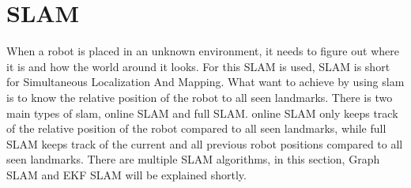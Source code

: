 \section{SLAM}
When a robot is placed in an unknown environment, it needs to figure out where it is and how the world around it looks. For this SLAM is used, SLAM is short for Simultaneous Localization And Mapping. 
What want to achieve by using slam is to know the relative position of the robot to all seen landmarks. There is two main types of slam, online SLAM and full SLAM. online SLAM only keeps track of the relative position of the robot compared to all seen landmarks, while full SLAM keeps track of the current and all previous robot positions compared to all seen landmarks.
There are multiple SLAM algorithms, in this section, Graph SLAM and EKF SLAM will be explained shortly.

